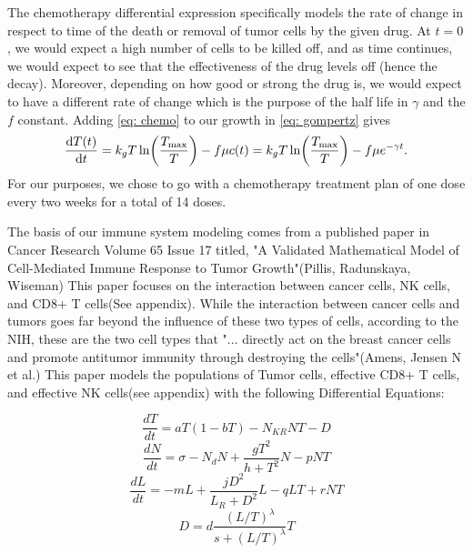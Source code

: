 \documentclass[11pt]{amsart}
\begin{document}
The chemotherapy differential expression specifically models the rate of change in respect to time of the death or removal of tumor cells by the given drug.
At $t=0$, we would expect a high number of cells to be killed off, and as time continues, we would expect to see that the effectiveness of the drug levels off (hence the decay).
Moreover, depending on how good or strong the drug is, we would expect to have a different rate of change which is the purpose of the half life in $\gamma$ and the $f$ constant.
Adding \eqref{eq: chemo} to our growth in \eqref{eq: gompertz} gives 
\begin{equation}
	\frac{\mathop{}\!\mathrm{d} T(t)}{\mathop{}\!\mathrm{d} t} = k_g T \ln \biggl(\frac{T_{\max}}{T} \biggr) - f \mu c(t) =k_g T \ln \biggl(\frac{T_{\max}}{T} \biggr) - f \mu e^{-\gamma t} \label{eq: gompertz-chemo}.
\end{equation}
For our purposes, we chose to go with a chemotherapy treatment plan of one dose every two weeks for a total of 14 doses. 


The basis of our immune system modeling comes from a published paper in Cancer Research Volume 65 Issue 17 titled, 
"A Validated Mathematical Model of Cell-Mediated Immune Response to Tumor Growth"(Pillis, Radunskaya, Wiseman)
This paper focuses on the interaction between cancer cells, NK cells, and CD8+ T cells(See appendix). 
While the interaction between cancer cells and tumors goes far beyond the influence of these two types of cells, 
according to the NIH, these are the two cell types that "... directly act on the breast cancer cells and promote antitumor immunity through destroying the cells"(Amens, Jensen N et al.)
This paper models the populations of Tumor cells, effective CD8+ T cells, and effective NK cells(see appendix) with the following Differential Equations:

\begin{equation} \label{eq1}
	\frac{dT}{dt} = aT(1-bT) - N_{KR}NT - D 
	\end{equation}
	\begin{equation} \label{eq2}
	\frac{dN}{dt} = \sigma - N_dN +\frac{gT^2}{h + T^2}N - pNT
	\end{equation}
	\begin{equation} \label{eq3}
	\frac{dL}{dt} = - mL +\frac{jD^2}{L_R + D^2}L - qLT + rNT
	\end{equation}
	\begin{equation} \label{eq4}
	D = d\frac{(L/T)^\lambda}{s + (L/T)^\lambda}T
	\end{equation}
\end{document}
